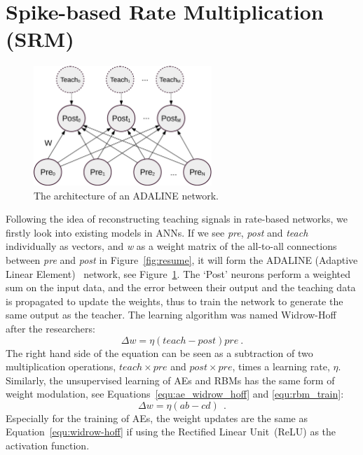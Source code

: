\section{Spike-based Rate Multiplication (SRM)}
\label{sec:SRM}
\begin{figure}
	\centering
	\includegraphics[width=0.6\textwidth]{pics_sdlm/adaline.png}
	\caption{The architecture of an ADALINE network.}
	\label{fig:adaline}
\end{figure}
Following the idea of reconstructing teaching signals in rate-based networks, we firstly look into existing models in ANNs.
If we see \textit{pre}, \textit{post} and \textit{teach} individually as vectors, and \textit{w} as a weight matrix of the all-to-all connections between \textit{pre} and \textit{post} in Figure~\ref{fig:resume}, it will form the ADALINE (Adaptive Linear Element)~\citep{widrow1960adaptive} network, see Figure~\ref{fig:adaline}.
The `Post' neurons perform a weighted sum on the input data, and the error between their output and the teaching data is propagated to update the weights, thus to train the network to generate the same output as the teacher. 
The learning algorithm was named Widrow-Hoff after the researchers:
\begin{equation}
\Delta w = \eta (teach - post)pre~.
\label{equ:widrow-hoff}
\end{equation}
The right hand side of the equation can be seen as a subtraction of two multiplication operations, $teach \times pre$ and $post \times pre$, times a learning rate, $\eta$.
Similarly, the unsupervised learning of AEs and RBMs has the same form of weight modulation, see Equations~\ref{equ:ae_widrow_hoff} and \ref{equ:rbm_train}:
\begin{equation}
\Delta w = \eta (ab-cd)~~.
\label{equ:two_sep}
\end{equation}
Especially for the training of AEs, the weight updates are the same as Equation~\ref{equ:widrow-hoff} if using the Rectified Linear Unit~(ReLU) as the activation function.

